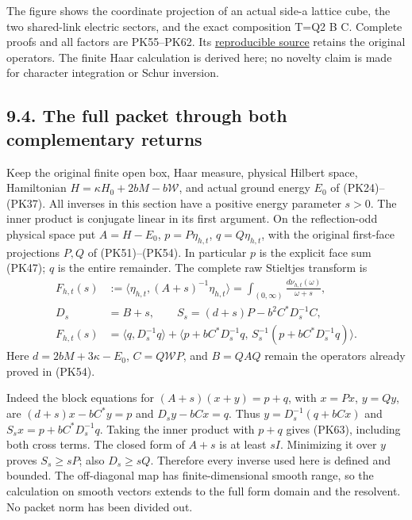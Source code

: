 \documentclass[11pt]{article}
\begin{document}
The figure shows the coordinate projection of an actual side-a lattice cube, the two shared-link electric sectors, and the exact composition T=Q2 B C. Complete proofs and all factors are PK55–PK62. Its \href{https://github.com/KokunoYumeto/yang-mills-interacting-workbench/blob/main/yang-mills/continuations/20260930-s6-ns-moment-map-bridge/figures/complementary_moment_figure.py}{reproducible source} retains the original operators. The finite Haar calculation is derived here; no novelty claim is made for character integration or Schur inversion.

\subsection*{9.4. The full packet through both complementary returns}

Keep the original finite open box, Haar measure, physical Hilbert space,
Hamiltonian \(H=\kappa H_0+2bM-b\mathcal W\), and actual ground energy
\(E_0\) of (PK24)–(PK37). All inverses in this section have a positive
energy parameter \(s>0\). The inner product is conjugate linear in its
first argument. On the reflection-odd physical space put
\(A=H-E_0\), \(p=P\eta_{h,t}\), \(q=Q\eta_{h,t}\), with the original
first-face projections \(P,Q\) of (PK51)–(PK54). In particular \(p\)
is the explicit face sum (PK47); \(q\) is the entire remainder.
The complete raw Stieltjes transform is
\[
 \begin{aligned}
 F_{h,t}(s)
 &:=\langle\eta_{h,t},(A+s)^{-1}\eta_{h,t}\rangle
   =\int_{(0,\infty)}\frac{d\nu_{h,t}(\omega)}{\omega+s},\\
 D_s&=B+s,\qquad
 S_s=(d+s)P-b^2C^*D_s^{-1}C,\\
 F_{h,t}(s)
 &=\langle q,D_s^{-1}q\rangle+
   \langle p+bC^*D_s^{-1}q,\,
        S_s^{-1}(p+bC^*D_s^{-1}q)\rangle .
 \end{aligned}\tag{PK63}
\]
Here \(d=2bM+3\kappa-E_0\), \(C=Q\mathcal WP\), and \(B=QAQ\)
remain the operators already proved in (PK54).

Indeed the block equations for \((A+s)(x+y)=p+q\), with \(x=Px\),
\(y=Qy\), are
\((d+s)x-bC^*y=p\) and \(D_sy-bCx=q\). Thus
\(y=D_s^{-1}(q+bCx)\) and
\(S_sx=p+bC^*D_s^{-1}q\). Taking the inner product with \(p+q\)
gives (PK63), including both cross terms. The closed form of \(A+s\)
is at least \(sI\). Minimizing it over \(y\) proves \(S_s\ge sP\);
also \(D_s\ge sQ\). Therefore every inverse used here is defined and
bounded. The off-diagonal map has finite-dimensional smooth range, so
the calculation on smooth vectors extends to the full form domain and
the resolvent. No packet norm has been divided out.
\end{document}
